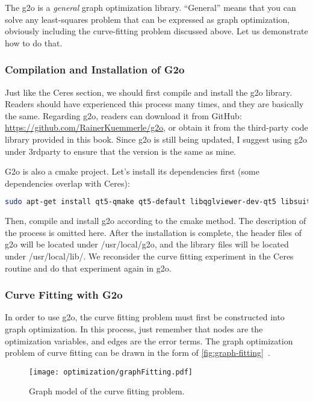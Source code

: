 The g2o is a \textit{general} graph optimization library. ``General'' means that you can solve any least-squares problem that can be expressed as graph optimization, obviously including the curve-fitting problem discussed above. Let us demonstrate how to do that.

\subsubsection{Compilation and Installation of G2o}
Just like the Ceres section, we should first compile and install the g2o library. Readers should have experienced this process many times, and they are basically the same. Regarding g2o, readers can download it from GitHub: \url{https://github.com/RainerKuemmerle/g2o}, or obtain it from the third-party code library provided in this book. Since g2o is still being updated, I suggest using g2o under 3rdparty to ensure that the version is the same as mine.

G2o is also a cmake project. Let's install its dependencies first (some dependencies overlap with Ceres):
\begin{lstlisting}[language=sh,caption=Terminal input:]
    sudo apt-get install qt5-qmake qt5-default libqglviewer-dev-qt5 libsuitesparse-dev libcxsparse3 libcholmod3
\end{lstlisting}

Then, compile and install g2o according to the cmake method. The description of the process is omitted here. After the installation is complete, the header files of g2o will be located under /usr/local/g2o, and the library files will be located under /usr/local/lib/. We reconsider the curve fitting experiment in the Ceres routine and do that experiment again in g2o.

\subsubsection{Curve Fitting with G2o}
In order to use g2o, the curve fitting problem must first be constructed into graph optimization. In this process, just remember that nodes are the optimization variables, and edges are the error terms. The graph optimization problem of curve fitting can be drawn in the form of \autoref{fig:graph-fitting}~.

\begin{figure}[!ht]
    \centering
    \texttt{[image: optimization/graphFitting.pdf]}
    \caption{Graph model of the curve fitting problem. }
    \label{fig:graph-fitting}
\end{figure}

